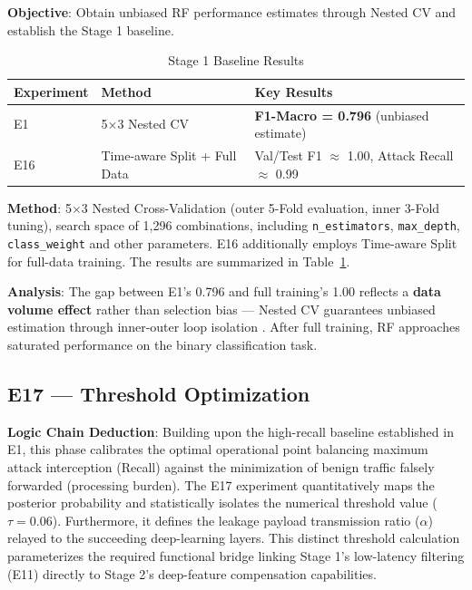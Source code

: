 \documentclass[sigconf]{acmart}
\begin{document}
\textbf{Objective}: Obtain unbiased RF performance estimates through Nested CV and establish the Stage 1 baseline.


\begin{table}[!t]
\caption{Stage 1 Baseline Results}
\label{tab:s1_baseline}
\begin{tabular}{p{1.5cm}p{5.5cm}p{9.5cm}}
\toprule
\textbf{Experiment} & \textbf{Method} & \textbf{Key Results} \\
\midrule
E1 & 5$\times$3 Nested CV & \textbf{F1-Macro = 0.796} (unbiased estimate) \\
E16 & Time-aware Split + Full Data & Val/Test F1 $\approx$ 1.00, Attack Recall $\approx$ 0.99 \\
\bottomrule
\end{tabular}
\end{table}

\textbf{Method}: 5$\times$3 Nested Cross-Validation (outer 5-Fold evaluation, inner 3-Fold tuning), search space of 1,296 combinations, including \texttt{n\_estimators}, \texttt{max\_depth}, \texttt{class\_weight} and other parameters. E16 additionally employs Time-aware Split for full-data training. The results are summarized in Table~\ref{tab:s1_baseline}.

\textbf{Analysis}: The gap between E1's 0.796 and full training's 1.00 reflects a \textbf{data volume effect} rather than selection bias --- Nested CV guarantees unbiased estimation through inner-outer loop isolation \cite{4}. After full training, RF approaches saturated performance on the binary classification task.

\subsection{E17 --- Threshold Optimization}
\textbf{Logic Chain Deduction}: Building upon the high-recall baseline established in E1, this phase calibrates the optimal operational point balancing maximum attack interception (Recall) against the minimization of benign traffic falsely forwarded (processing burden). The E17 experiment quantitatively maps the posterior probability and statistically isolates the numerical threshold value ($\tau=0.06$). Furthermore, it defines the leakage payload transmission ratio ($\alpha$) relayed to the succeeding deep-learning layers. This distinct threshold calculation parameterizes the required functional bridge linking Stage 1's low-latency filtering (E11) directly to Stage 2's deep-feature compensation capabilities.
\end{document}

